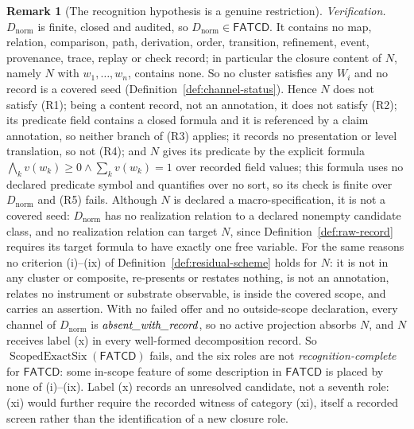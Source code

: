 \documentclass[11pt]{article}
\theoremstyle{definition}
\newtheorem{remark}[theorem]{Remark}
\newcommand{\FATCD}{\ensuremath{\mathsf{FATCD}}}
\newcommand{\ScopedExactSix}[1]{\ensuremath{\operatorname{ScopedExactSix}\!\left(#1\right)}}
\newcommand{\absentrec}{\textit{absent\_\allowbreak with\_\allowbreak record}}
\begin{document}
\begin{remark}[The recognition hypothesis is a genuine restriction]
\emph{Verification.} \(D_{\mathrm{norm}}\) is finite, closed and
audited, so \(D_{\mathrm{norm}}\in\FATCD{}\). It contains no map, relation,
comparison, path, derivation, order, transition, refinement, event,
provenance, trace, replay or check record; in particular the closure content
of \(N\), namely \(N\) with \(w_1,\dots,w_n\), contains none. So no cluster
satisfies any \(W_i\)
and no record is a covered seed (Definition~\ref{def:channel-status}). Hence
\(N\) does not satisfy (R1); being a content record, not an annotation, it does not satisfy (R2); its predicate field contains a closed formula and it is referenced by a claim annotation, so neither branch of (R3) applies;
it records no presentation or level translation, so not (R4); and \(N\) gives
its predicate by the explicit formula \(\bigwedge_k v(w_k)\ge0\wedge\sum_k v(w_k)=1\) over recorded field
values; this formula uses no declared predicate symbol and quantifies over no
sort, so its check is finite over \(D_{\mathrm{norm}}\) and (R5) fails.
Although \(N\) is declared a macro-specification, it is not a covered seed:
\(D_{\mathrm{norm}}\) has no realization relation to a declared nonempty
candidate class, and no realization relation can target \(N\), since
Definition~\ref{def:raw-record} requires its target formula to have exactly one
free variable. For the same reasons no
criterion (i)--(ix) of Definition~\ref{def:residual-scheme} holds for \(N\):
it is not in any cluster or composite, re-presents or restates nothing, is not
an annotation, relates no instrument or substrate observable, is inside the
covered scope, and carries an assertion. With no failed offer and no outside-scope declaration,
every channel of \(D_{\mathrm{norm}}\) is \(\absentrec\), so no active projection absorbs \(N\), and \(N\) receives
label (x) in every well-formed decomposition record. So \(\ScopedExactSix{\FATCD{}}\)
fails, and the six roles are not \emph{recognition-complete} for \FATCD{}: some in-scope
feature of some description in \FATCD{} is placed by none of (i)--(ix).
Label (x) records an unresolved candidate, not a seventh role: (xi) would
further require the recorded witness of category (xi), itself a recorded
screen rather than the identification of a new closure role.


\end{remark}
\end{document}

